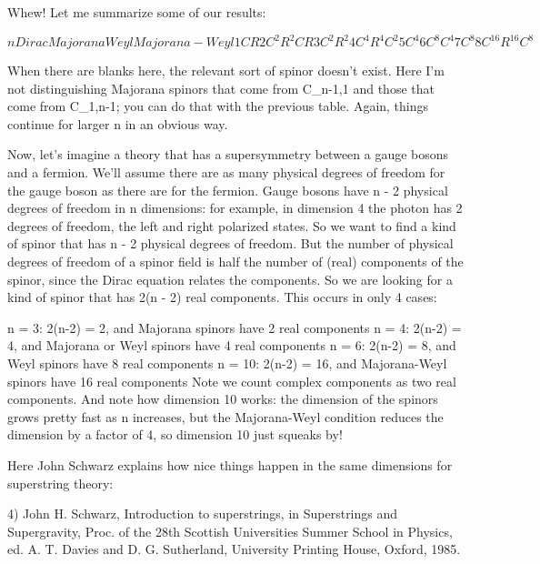 Whew!  Let me summarize some of our results:


$$

n    Dirac     Majorana       Weyl    Majorana-Weyl

1     C           R             
2     C^{2}          R^{2}           C           R
3     C^{2}          R^{2} 
4     C^{4}          R^{4}           C^{2}
5     C^{4}        
6     C^{8}                       C^{4}
7     C^{8}
8     C^{16}         R^{16}          C^{8}

$$
    
When there are blanks here, the relevant sort of spinor doesn't
exist.  Here I'm not distinguishing Majorana spinors that come from
C_{n-1,1} and those that come from C_{1,n-1}; you can do that with
the previous table.  Again, things continue for larger n in an obvious
way.  

Now, let's imagine a theory that has a supersymmetry between a gauge
bosons and a fermion.  We'll assume there are as many physical degrees of 
freedom for the gauge boson as there are for the fermion.   Gauge
bosons have n - 2 physical degrees of freedom in n dimensions: for
example, in dimension 4 the photon has 2 degrees of freedom, the left
and right polarized states.  So we want to find a kind of spinor that
has n - 2 physical degrees of freedom.  But the number of physical
degrees of freedom of a spinor field is half the number of (real) 
components of the spinor, since the Dirac equation relates the
components.  So we are looking for a kind of spinor that has 2(n - 2)
real components.  This occurs in only 4 cases:

n = 3:    2(n-2) = 2, and Majorana spinors have 2 real components
n = 4:  2(n-2) = 4, and Majorana or Weyl spinors have 4 real components
n = 6:  2(n-2) = 8, and Weyl spinors have 8 real components
n = 10:  2(n-2) = 16, and Majorana-Weyl spinors have 16 real components
Note we count complex components as two real components.  And note how
dimension 10 works: the dimension of the spinors grows pretty fast as
n increases, but the Majorana-Weyl condition reduces the dimension by
a factor of 4, so dimension 10 just squeaks by!

Here John Schwarz explains how nice things happen in the same dimensions
for superstring theory: 

4) John H. Schwarz, Introduction to superstrings, in Superstrings
and Supergravity, Proc. of the 28th Scottish Universities Summer
School in Physics, ed. A. T. Davies and D. G. Sutherland, University
Printing House, Oxford, 1985.

